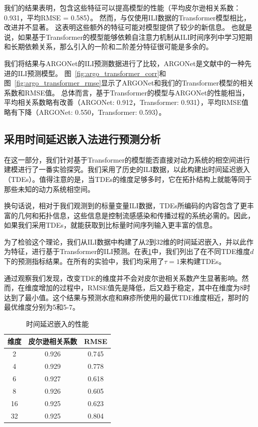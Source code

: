         我们的结果表明，包含这些特征可以提高模型的性能（平均皮尔逊相关系数：0.931，平均RMSE = 0.585）。
        然而，与仅使用ILI数据的Transformer模型相比，改进并不显著。
        这表明这些额外的特征可能对模型提供了较少的新信息。
        也就是说，如果基于Transformer的模型能够依赖自注意力机制从ILI时间序列中学习短期和长期依赖关系，那么引入的一阶和二阶差分特征很可能是多余的。
        
        我们将结果与ARGONet的ILI预测数据进行了比较，ARGONet是文献中的一种先进的ILI预测模型。
        图~\ref{fig:argo_transformer_corr}和图~\ref{fig:argo_transformer_rmse}显示了ARGONet和我们的Transformer模型的相关系数和RMSE值。
        总体而言，基于Transformer的模型与ARGONet的性能相当，平均相关系数略有改善（ARGONet: 0.912，Transformer: 0.931），平均RMSE值略有下降（ARGONet: 0.550，Transformer: 0.593）。
        
        \subsection{采用时间延迟嵌入法进行预测分析}

        在这一部分，我们针对基于Transformer的模型能否直接对动力系统的相空间进行建模进行了一番实验探究。我们采用了历史的ILI数据，以此构建出时间延迟嵌入（TDEs）。值得注意的是，当TDEs的维度足够多时，它在拓扑结构上就能等同于那些未知的动力系统相空间。
        
        换句话说，相对于我们观测到的标量变量ILI数据，TDEs所编码的内容包含了更丰富的几何和拓扑信息，这些信息是控制流感感染和传播过程的系统必需的。因此，如果我们采用TDEs，就能获取到比标量时间序列输入更丰富的信息。
        
        为了检验这个理论，我们从ILI数据中构建了从2到32维的时间延迟嵌入，并以此作为特征，进行基于Transformer的ILI预测。在表\ref{tde:dim}中，我们列出了在不同TDE维度$d$下的预测指标结果。在所有的实验中，我们均采用了$\tau=1$来构建TDEs。
        
        通过观察我们发现，改变TDE的维度并不会对皮尔逊相关系数产生显著影响。然而，在维度增加的过程中，RMSE值先是降低，后又趋于稳定，其中在维度为8时达到了最小值。这个结果与预测水痘和麻疹所使用的最优TDE维度相近，那时的最优维度分别为5和5-7。
        \begin{table}[h!]
            \centering
            \caption{时间延迟嵌入的性能}
            \label{tde:dim}
            \begin{tabular}{| c || c | c ||}
            \hline
            维度 & 皮尔逊相关系数 & RMSE\\ [0.5ex]
            \hline\hline
            2 & 0.926 & 0.745 \\ [1ex]
            \hline
            4 & 0.929 & 0.778 \\ [1ex]
            \hline
            6 & 0.927 & 0.618 \\ [1ex]
            \hline
            8 & 0.926  & 0.605  \\ [1ex]
            \hline
            16 & 0.925 & 0.623 \\ [1ex]
            \hline
            32 & 0.925 & 0.804 \\ [1ex]
            \hline
            \end{tabular}
            \end{table}
            
